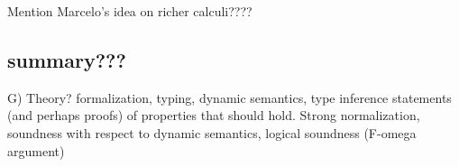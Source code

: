 Mention Marcelo's idea on richer calculi????

\subsection{summary???}
G) Theory?
   formalization, typing, dynamic semantics, type inference
   statements (and perhaps proofs) of properties that should hold.
   Strong normalization, soundness with respect to dynamic semantics,
   logical soundness (F-omega argument)

